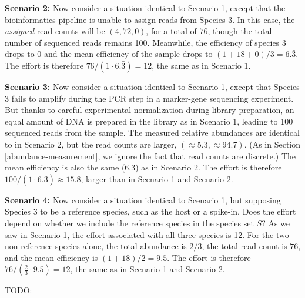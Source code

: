 \documentclass[
]{article}
\begin{document}
\textbf{Scenario 2:}
Now consider a situation identical to Scenario 1, except that the bioinformatics pipeline is unable to assign reads from Species 3.
In this case, the \emph{assigned} read counts will be \((4, 72, 0)\), for a total of \(76\), though the total number of sequenced reads remains 100.
Meanwhile, the efficiency of species 3 drops to 0 and the mean efficiency of the sample drops to \((1 + 18 + 0) / 3 = 6.\bar 3\).
The effort is therefore \(76 / (1 \cdot 6.\bar 3) = 12\), the same as in Scenario 1.

\textbf{Scenario 3:}
Now consider a situation identical to Scenario 1, except that Species 3 fails to amplify during the PCR step in a marker-gene sequencing experiment.
But thanks to careful experimental normalization during library preparation, an equal amount of DNA is prepared in the library as in Scenario 1, leading to 100 sequenced reads from the sample.
The measured relative abundances are identical to in Scenario 2, but the read counts are larger, \((\approx 5.3, \approx 94.7)\).
(As in Section \ref{abundance-measurement}, we ignore the fact that read counts are discrete.)
The mean efficiency is also the same (\(6.\bar 3\)) as in Scenario 2.
The effort is therefore \(100 / (1 \cdot 6.\bar 3) \approx 15.8\), larger than in Scenario 1 and Scenario 2.

\textbf{Scenario 4:}
Now consider a situation identical to Scenario 1, but supposing Species 3 to be a reference species, such as the host or a spike-in.
Does the effort depend on whether we include the reference species in the species set \(S\)?
As we saw in Scenario 1, the effort associated with all three species is 12.
For the two non-reference species alone, the total abundance is \(2/3\), the total read count is \(76\), and the mean efficiency is \((1 + 18) / 2 = 9.5\).
The effort is therefore \(76 /(\tfrac{2}{3} \cdot 9.5) = 12\), the same as in Scenario 1 and Scenario 2.

TODO:
\end{document}
